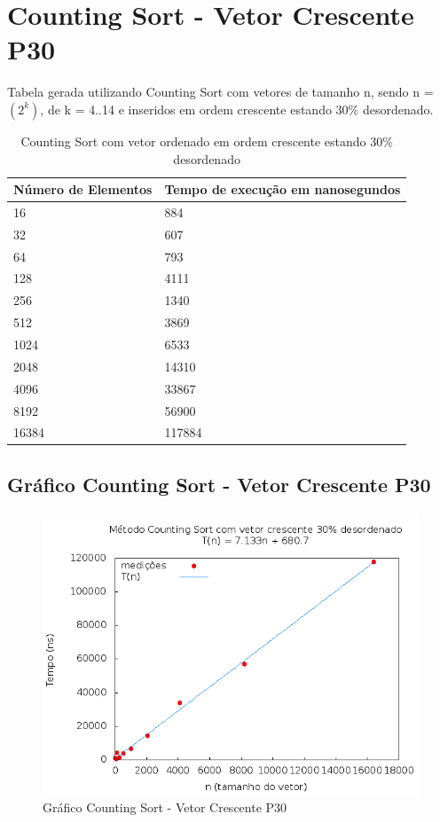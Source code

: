 \documentclass[12pt,a4paper,twoside]{report}
\begin{document}
\section{Counting Sort - Vetor Crescente P30}
Tabela gerada utilizando Counting Sort com vetores de tamanho n, sendo n = $(2^k)$, de k = 4..14 e inseridos em ordem crescente estando 30\% desordenado.
\begin{table}[H]
\centering
\caption{Counting Sort com vetor ordenado em ordem crescente estando 30\% desordenado}
\label{my-label}
\begin{tabular}{|l|l|}
\hline
\multicolumn{1}{|c|}{\textbf{Número de Elementos}} & \multicolumn{1}{c|}{\textbf{Tempo de execução em nanosegundos}} \\ \hline
16 & 884 \\ \hline
32 & 607 \\ \hline
64 & 793 \\ \hline
128 & 4111 \\ \hline
256 & 1340 \\ \hline
512 & 3869 \\ \hline
1024 & 6533 \\ \hline
2048 & 14310 \\ \hline
4096 & 33867 \\ \hline
8192 & 56900 \\ \hline
16384 & 117884 \\ \hline
\end{tabular}
\end{table}

\subsection{Gráfico Counting Sort - Vetor Crescente P30}
\begin{figure}[H]
    \centering
    \includegraphics[width=0.7\linewidth]{graficos/CountingSort/vIntCrescenteP30/vIntCrescenteP30.png}
  \caption{Gráfico Counting Sort - Vetor Crescente P30}
\end{figure}
\end{document}
